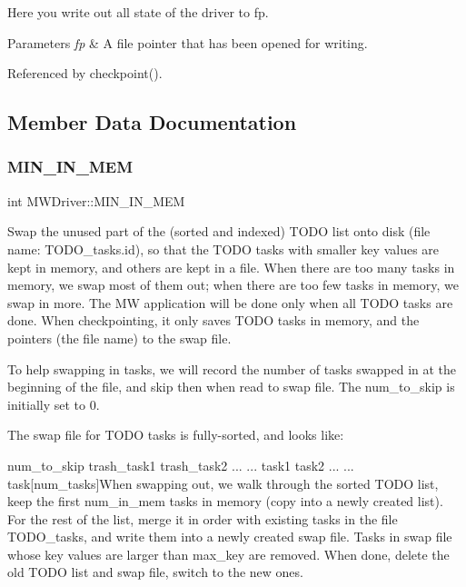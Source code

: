 Here you write out all \textquotesingle{}state\textquotesingle{} of the driver to fp. 
\begin{DoxyParams}{Parameters}
{\em fp} & A file pointer that has been opened for writing. \\
\hline
\end{DoxyParams}


Referenced by checkpoint().



\subsection{Member Data Documentation}
\mbox{\label{classMWDriver_a033da9ddab14c10d0c174ee778234221}} 
\subsubsection{\texorpdfstring{M\+I\+N\+\_\+\+I\+N\+\_\+\+M\+EM}{MIN\_IN\_MEM}}
{\footnotesize\ttfamily int M\+W\+Driver\+::\+M\+I\+N\+\_\+\+I\+N\+\_\+\+M\+EM}

Swap the unused part of the (sorted and indexed) T\+O\+DO list onto disk (file name\+: T\+O\+D\+O\+\_\+tasks.\+id), so that the T\+O\+DO tasks with smaller key values are kept in memory, and others are kept in a file. When there are too many tasks in memory, we swap most of them out; when there are too few tasks in memory, we swap in more. The MW application will be done only when all T\+O\+DO tasks are done. When checkpointing, it only saves T\+O\+DO tasks in memory, and the pointers (the file name) to the swap file.

To help swapping in tasks, we will record the number of tasks swapped in at the beginning of the file, and skip then when read to swap file. The num\+\_\+to\+\_\+skip is initially set to 0.

The swap file for T\+O\+DO tasks is fully-\/sorted, and looks like\+:

num\+\_\+to\+\_\+skip trash\+\_\+task1 trash\+\_\+task2 ... ... task1 task2 ... ... task\mbox{[}num\+\_\+tasks\mbox{]}When swapping out, we walk through the sorted T\+O\+DO list, keep the first num\+\_\+in\+\_\+mem tasks in memory (copy into a newly created list). For the rest of the list, merge it in order with existing tasks in the file T\+O\+D\+O\+\_\+tasks, and write them into a newly created swap file. Tasks in swap file whose key values are larger than max\+\_\+key are removed. When done, delete the old T\+O\+DO list and swap file, switch to the new ones.

